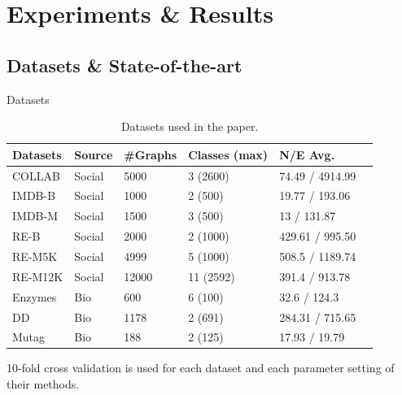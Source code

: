 \documentclass{beamer}
\begin{document}
    \section{Experiments \& Results}

    \subsection{Datasets \& State-of-the-art}

    \begin{frame}{Datasets}
        \begin{table}
            \centering
            \begin{tabular}{llllll}
                \textbf{Datasets} & \textbf{Source} & \textbf{\#Graphs} &
                \textbf{Classes (max)} & \textbf{N/E Avg.}\\\hline
                COLLAB & Social & 5000 & 3 (2600) & 74.49 / 4914.99\\
                IMDB-B & Social & 1000 & 2 (500) & 19.77 / 193.06\\
                IMDB-M & Social & 1500 & 3 (500) & 13 / 131.87\\
                RE-B & Social & 2000 & 2 (1000) & 429.61 / 995.50\\
                RE-M5K & Social & 4999 & 5 (1000) & 508.5 / 1189.74\\
                RE-M12K & Social & 12000 & 11 (2592) & 391.4 / 913.78\\
                Enzymes & Bio & 600 & 6 (100) & 32.6 / 124.3\\
                DD & Bio & 1178 & 2 (691) & 284.31 / 715.65\\
                Mutag & Bio & 188 & 2 (125) & 17.93 / 19.79\\
            \end{tabular}
            \caption{Datasets used in the paper.}
            \label{tab:datasets}
        \end{table}
        \vspace{-0.5em}
        10-fold cross validation is used for each dataset and each 
        parameter setting of their methods. 
    \end{frame}
\end{document}
